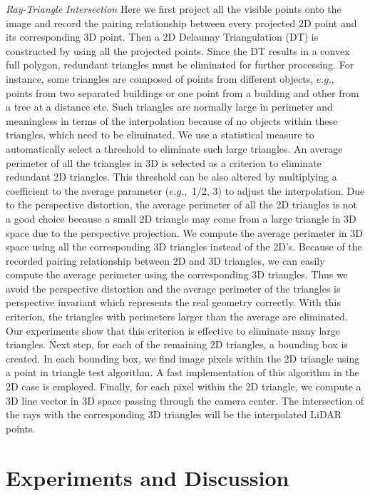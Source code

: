 {\it Ray-Triangle Intersection} Here we first project all the visible points onto the image and record the pairing relationship between every projected 2D point and its corresponding 3D point. Then a 2D Delaunay Triangulation (DT) is constructed by using all the projected points. Since the DT results in a convex full polygon, redundant triangles must be eliminated for further processing. For instance, some triangles are composed of points from different objects, $e.g.,$ points 
from two separated buildings or one point from a building and other from a tree at a distance etc. Such triangles are normally large in perimeter and meaningless in terms of the interpolation because of no  objects within these triangles, which need to be eliminated. We use a statistical measure to automatically
select a threshold to eliminate such large triangles. An average perimeter of all the triangles in 3D is selected as a criterion to eliminate redundant 2D triangles. This threshold can be also altered by multiplying a coefficient to the average parameter
($e.g.,$ 1/2, 3) to adjust the interpolation. Due to the perspective distortion, the average perimeter of all the 2D triangles is not a good choice because a small 2D triangle may come from a large triangle in 3D space due to the perspective projection. We compute the average perimeter in 3D space using all the corresponding 3D triangles instead of the 2D's. Because of the recorded pairing relationship between 2D and 3D triangles, we can easily compute the average perimeter using the corresponding 3D triangles. Thus we avoid the perspective distortion and the average perimeter of the triangles is perspective invariant which represents the real geometry
correctly. With this criterion, the triangles with perimeters larger than the average are eliminated. Our experiments show that this criterion is effective to eliminate many large triangles. Next step, for each of the remaining 2D triangles, a bounding box is created. In each bounding box, we find image pixels within the 2D triangle using a point in triangle test algorithm. A fast implementation of this algorithm in the 2D case is employed. Finally, for each pixel within the 2D triangle, we compute a 3D line vector in 3D space passing through the camera center. The intersection of the rays with the corresponding 3D triangles will be the interpolated LiDAR points. 

\section{Experiments and Discussion}

